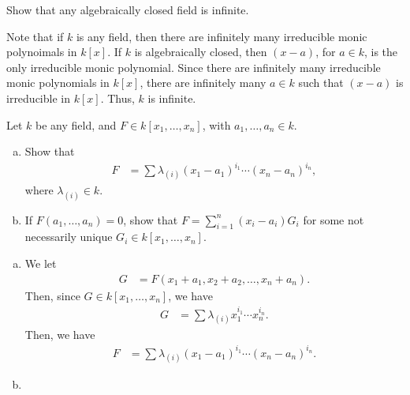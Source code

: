 \documentclass[10pt]{mypackage}
\begin{document}
\begin{exercise}[Exercise 1.6]
Show that any algebraically closed field is infinite.
\end{exercise}
\begin{solution}
  Note that if $k$ is any field, then there are infinitely many irreducible monic polynoimals in $k\left[x\right]$. If $k$ is algebraically closed, then $\left(x-a\right)$, for $a\in k$, is the only irreducible monic polynomial. Since there are infinitely many irreducible monic polynomials in $k\left[x\right]$, there are infinitely many $a\in k$ such that $\left(x-a\right)$ is irreducible in $k\left[x\right]$. Thus, $k$ is infinite.
\end{solution}

\begin{exercise}[Exercise 1.7]
Let $k$ be any field, and $F\in k\left[x_1,\dots,x_n\right]$, with $a_1,\dots,a_n\in k$.
\begin{enumerate}[(a)]
  \item Show that
    \begin{align*}
      F &= \sum\lambda_{(i)}\left(x_1-a_1\right)^{i_1}\cdots \left(x_n-a_n\right)^{i_n},
    \end{align*}
    where $\lambda_{(i)}\in k$.
  \item If $F\left(a_1,\dots,a_n\right) = 0$, show that $F = \sum_{i=1}^{n}\left(x_i - a_i\right)G_i$ for some not necessarily unique $G_i\in k\left[x_1,\dots,x_n\right]$.
\end{enumerate}
\end{exercise}
\begin{solution}\hfill
  \begin{enumerate}[(a)]
    \item We let
      \begin{align*}
        G &= F\left(x_1+a_1,x_2 + a_2,\dots,x_n + a_n\right).
      \end{align*}
      Then, since $G\in k\left[x_1,\dots,x_n\right]$, we have
      \begin{align*}
        G &= \sum \lambda_{(i)}x_1^{i_1}\cdots x_n^{i_n}.
      \end{align*}
      Then, we have
      \begin{align*}
        F &= \sum \lambda_{(i)}\left(x_1 - a_1\right)^{i_1} \cdots \left(x_n-a_n\right)^{i_n}.
      \end{align*}
    \item {}
  \end{enumerate}
\end{solution}
\end{document}
